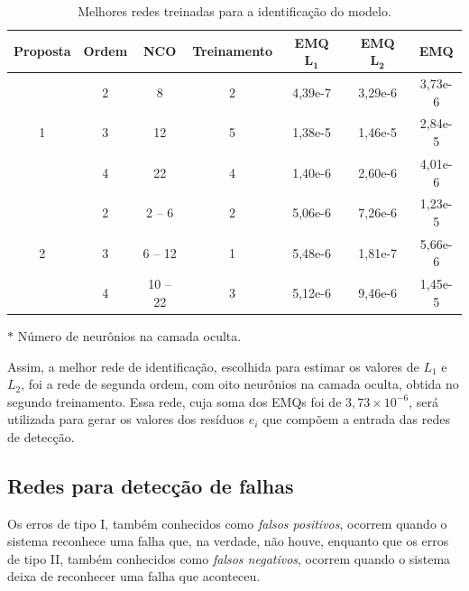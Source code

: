\begin{table}[htb]
\small
\centering
\caption{Melhores redes treinadas para a identificação do modelo.}
\label{tab:melhores_rnas_ident}
\vspace{0.25cm}
\begin{threeparttable}
\begin{tabular}{|c|c|c|c|c|c|c|}
\hline
{\bf Proposta} & 
{\bf Ordem} & 
{\bf NCO\tnote{$*$}} & 
{\bf Treinamento} &
{\bf EMQ $\mathbf{L_1}$} & 
{\bf EMQ $\mathbf{L_2}$} & 
{\bf EMQ}\\
\hline
\hline
\multirow{3}{*}{1} &
\cellcolor[gray]{0.85} 2 &
\cellcolor[gray]{0.85} 8 &
\cellcolor[gray]{0.85}2 &
\cellcolor[gray]{0.85} 4,39e-7 &
\cellcolor[gray]{0.85} 3,29e-6 &
\cellcolor[gray]{0.85} 3,73e-6\\
\cline{2-7}
&3 & 12 & 5 & 1,38e-5 & 1,46e-5 & 2,84e-5\\
\cline{2-7}
&4 & 22 & 4 & 1,40e-6 & 2,60e-6 & 4,01e-6\\
\hline
\multirow{3}{*}{2} & 2 & 2 -- 6 & 2 & 5,06e-6 & 7,26e-6 & 1,23e-5\\
\cline{2-7}
& 3 & 6 -- 12 & 1 & 5,48e-6 & 1,81e-7 & 5,66e-6\\
\cline{2-7}
& 4 & 10 -- 22 & 3 & 5,12e-6 & 9,46e-6 & 1,45e-5\\
\hline
\end{tabular}
\begin{tablenotes}
\item [$*$] Número de neurônios na camada oculta.
\end{tablenotes}
\end{threeparttable}
\end{table}

Assim, a melhor rede de identificação, escolhida para estimar os valores de
$L_1$ e $L_2$, foi a rede de segunda ordem, com oito neurônios na camada oculta,
obtida no segundo treinamento. Essa rede, cuja soma dos EMQs foi de $3,73 \times
10^{-6}$, será utilizada para gerar os valores dos resíduos $e_i$
que compõem a entrada das redes de detecção.

\subsection{Redes para detecção de falhas}
Os erros de tipo I, também conhecidos como {\it falsos positivos}, ocorrem
quando o sistema reconhece uma falha que, na verdade, não houve, enquanto que os
erros de tipo II, também conhecidos como {\it falsos negativos}, ocorrem quando
o sistema deixa de reconhecer uma falha que aconteceu.

